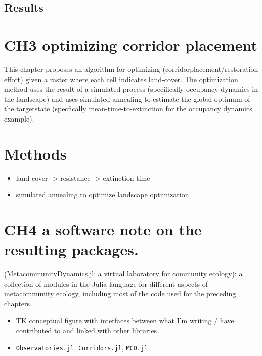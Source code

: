\documentclass[10pt,oneside]{article}
\begin{document}
\hypertarget{results}{%
\subsection{Results}\label{results}}

\hypertarget{ch3-optimizing-corridor-placement}{%
\section{CH3 optimizing corridor
placement}\label{ch3-optimizing-corridor-placement}}

This chapter proposes an algorithm for optimizing
(corridorplacement/restoration effort) given a raster where each cell
indicates land-cover. The optimization method uses the result of a
simulated process (specifically occupancy dynamics in the landscape) and
uses simulated annealing to estimate the global optimum of the
targetstate (specfically mean-time-to-extinction for the occupancy
dynamics example).

\hypertarget{methods-2}{%
\section{Methods}\label{methods-2}}

\begin{itemize}
\tightlist
\item
  land cover -\textgreater{} resistance -\textgreater{} extinction time
\item
  simulated annealing to optimize landscape optimization
\end{itemize}

\hypertarget{ch4-a-software-note-on-the-resulting-packages.}{%
\section{CH4 a software note on the resulting
packages.}\label{ch4-a-software-note-on-the-resulting-packages.}}

(MetacommunityDynamics.jl: a virtual laboratory for community ecology):
a collection of modules in the Julia language for different aspects of
metacommunity ecology, including most of the code used for the preceding
chapters.

\begin{itemize}
\item
  TK conceptual figure with interfaces between what I'm writing / have
  contributed to and linked with other libraries
\item
  \texttt{Observatories.jl}, \texttt{Corridors.jl}, \texttt{MCD.jl}
\end{itemize}
\end{document}
